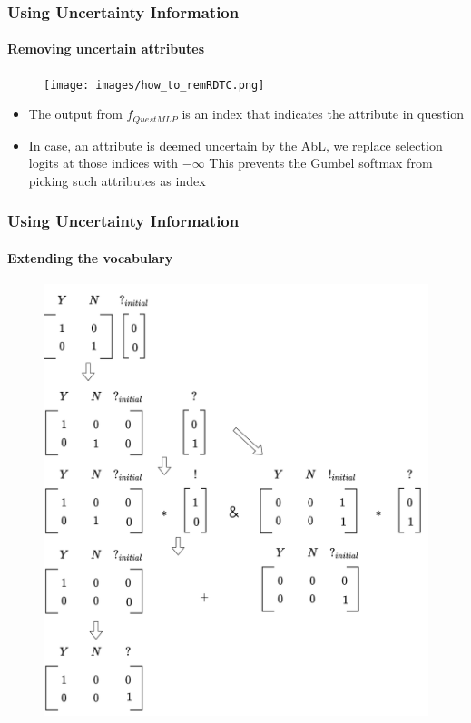 \documentclass[9pt]{beamer}
\begin{document}
\begin{frame}
\frametitle{Using Uncertainty Information}
\framesubtitle{Removing uncertain attributes}
\begin{figure}
	\texttt{[image: images/how\_to\_remRDTC.png]}
\end{figure}
\begin{itemize}
	\item The output from $f_{QuestMLP}$ is an index that indicates the attribute in question
	\item In case, an attribute is deemed uncertain by the AbL, we replace selection logits at those indices with $-\infty$
	This prevents the Gumbel softmax from picking such attributes as index
\end{itemize}
\end{frame}


\begin{frame}
\frametitle{Using Uncertainty Information}
\framesubtitle{Extending the vocabulary}
\begin{figure}
	\includegraphics[width=0.6\linewidth]{images/extended_vocab.pdf}
\end{figure}
\end{frame}
\end{document}
